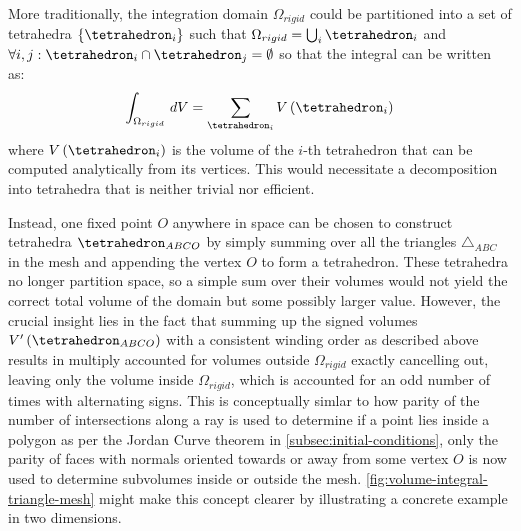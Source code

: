 \documentclass[oneside, a4paper]{book}
\newcommand\br[1]{\left(#1\right)}
\begin{document}
  More traditionally, the integration domain $\Omega_{rigid}$ could be partitioned into a set of tetrahedra $\{\tetrahedron_i\}$ such that $\Omega_{rigid} = \bigcup_i \tetrahedron_i$ and $\forall i,j: \tetrahedron_i \cap \tetrahedron_j = \emptyset$ so that the integral can be written as:
  \begin{equation}
    \int_{\Omega_{rigid}} \,dV = \sum_{\tetrahedron_i} V\br{\tetrahedron_i}
  \end{equation} where $V\br{\tetrahedron_i}$ is the volume of the $i$-th tetrahedron that can be computed analytically from its vertices. This would necessitate a decomposition into tetrahedra that is neither trivial nor efficient. 
  
  Instead, one fixed point $O$ anywhere in space can be chosen to construct tetrahedra $\tetrahedron_{ABCO}$ by simply summing over all the triangles $\triangle_{ABC}$ in the mesh and appending the vertex $O$ to form a tetrahedron. These tetrahedra no longer partition space, so a simple sum over their volumes would not yield the correct total volume of the domain but some possibly larger value. However, the crucial insight lies in the fact that summing up the signed volumes $V'\br{\tetrahedron_{ABCO}}$ with a consistent winding order as described above results in multiply accounted for volumes outside $\Omega_{rigid}$ exactly cancelling out, leaving only the volume inside $\Omega_{rigid}$, which is accounted for an odd number of times with alternating signs. This is conceptually simlar to how parity of the number of intersections along a ray is used to determine if a point lies inside a polygon as per the Jordan Curve theorem in \autoref{subsec:initial-conditions}, only the parity of faces with normals oriented towards or away from some vertex $O$ is now used to determine subvolumes inside or outside the mesh. \autoref{fig:volume-integral-triangle-mesh} might make this concept clearer by illustrating a concrete example in two dimensions. 
  
\end{document}
